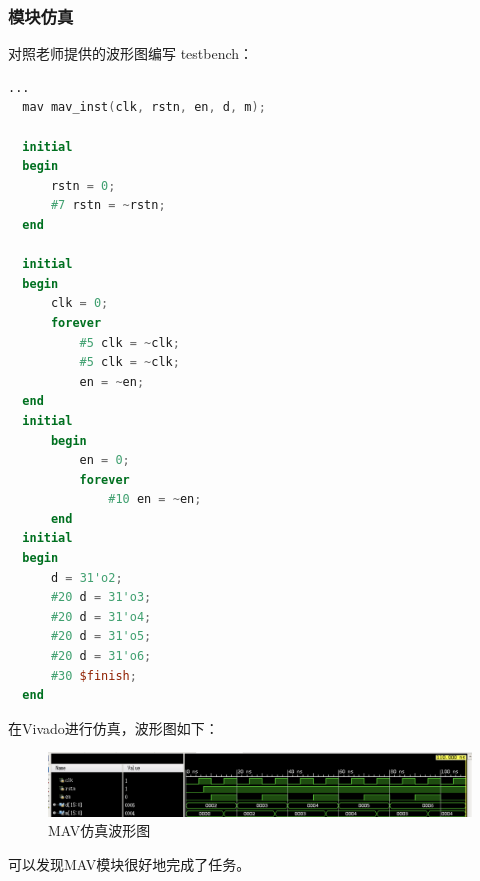 \documentclass[a4paper]{article}
\begin{document}
\subsubsection{模块仿真} 
对照老师提供的波形图编写 testbench：
\begin{lstlisting}[language={verilog},title={mav.v}]
  ...
  mav mav_inst(clk, rstn, en, d, m);

  initial 
  begin
      rstn = 0;
      #7 rstn = ~rstn;
  end

  initial
  begin
      clk = 0;
      forever
          #5 clk = ~clk;
          #5 clk = ~clk;
          en = ~en;
  end
  initial
      begin
          en = 0;
          forever
              #10 en = ~en;
      end
  initial
  begin
      d = 31'o2;
      #20 d = 31'o3;
      #20 d = 31'o4;
      #20 d = 31'o5;
      #20 d = 31'o6;
      #30 $finish;
  end
\end{lstlisting}
在Vivado进行仿真，波形图如下：
\begin{figure}[H]
  \centering
  \includegraphics[width=1.0\textwidth]{mav_sim.png}
  \caption{MAV仿真波形图}
  \label{fig:mav}
\end{figure}
可以发现MAV模块很好地完成了任务。
\end{document}
